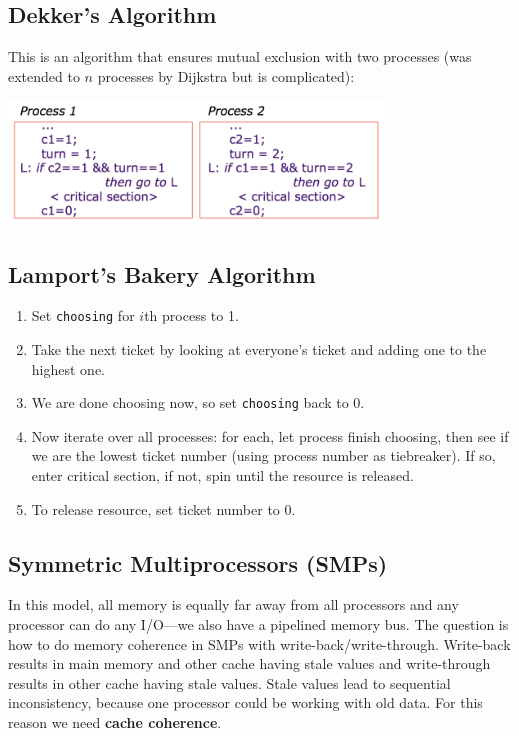 \documentclass{article}
\begin{document}
\subsection{Dekker's Algorithm}

This is an algorithm that ensures mutual exclusion with two processes (was extended to $n$ processes by Dijkstra but is complicated):
\begin{center}
\includegraphics[width=0.75\textwidth]{dekker}
\end{center}

\subsection{Lamport's Bakery Algorithm}

\begin{enumerate}
\item Set \texttt{choosing} for $i$th process to 1.
\item Take the next ticket by looking at everyone's ticket and adding one to the highest one.
\item We are done choosing now, so set \texttt{choosing} back to 0.
\item Now iterate over all processes: for each, let process finish choosing, then see if we are the lowest ticket number (using process number as tiebreaker). If so, enter critical section, if not, spin until the resource is released.
\item To release resource, set ticket number to 0.
\end{enumerate}

\subsection{Symmetric Multiprocessors (SMPs)}

In this model, all memory is equally far away from all processors and any processor can do any I/O---we also have a pipelined memory bus. The question is how to do memory coherence in SMPs with write-back/write-through. Write-back results in main memory and other cache having stale values and write-through results in other cache having stale values. Stale values lead to sequential inconsistency, because one processor could be working with old data. For this reason we need \textbf{cache coherence}.
\end{document}
